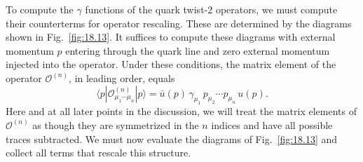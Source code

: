 To compute the $\gamma$ functions of the quark twist-2 operators, we must
compute their counterterms for operator rescaling.  These are determined by
the diagrams shown in Fig.~\ref{fig:18.13}.  It suffices to compute these
diagrams with external momentum $p$ entering through the quark line and zero
external momentum injected into the operator.  Under these conditions, the
matrix element of the operator $\mathcal{O}^{(n)}$, in leading order, equals
\begin{equation}
  \langle p|\mathcal{O}^{(n)}_{\mu_1\cdots\mu_n}|p\rangle
  = \bar{u}(p)\,\gamma_{\mu_1}\,p_{\mu_2}\cdots p_{\mu_n}\,u(p) .
  \label{eq:18.161}
\end{equation}
Here and at all later points in the discussion, we will treat the matrix
elements of $\mathcal{O}^{(n)}$ as though they are symmetrized in the $n$
indices and have all possible traces subtracted.  We must now evaluate the
diagrams of Fig.~\ref{fig:18.13} and collect all terms that rescale this
structure.

